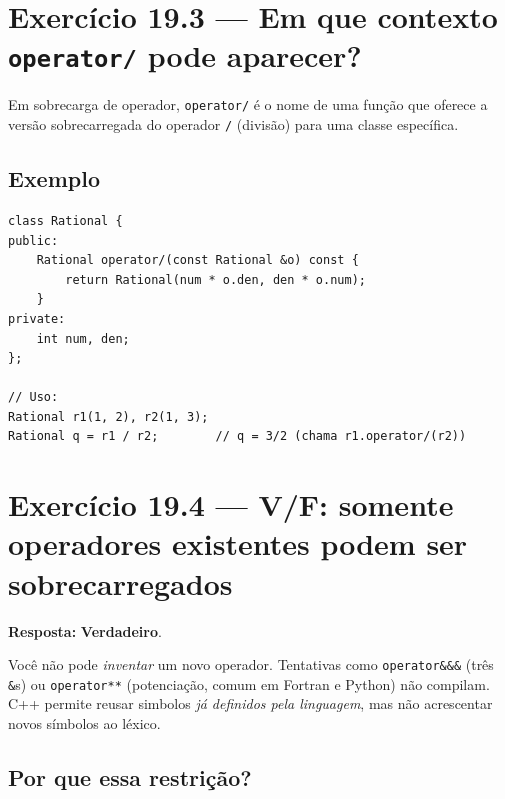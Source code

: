 \documentclass[11pt,a4paper]{article}
\begin{document}
\section{Exerc\'icio 19.3 --- Em que contexto \texttt{operator/} pode aparecer?}

\begin{resposta}
Em sobrecarga de operador, \texttt{operator/} \'e o nome de uma fun\c{c}\~ao que oferece a vers\~ao sobrecarregada do operador \texttt{/} (divis\~ao) para uma classe espec\'ifica.
\end{resposta}

\subsection*{Exemplo}

\begin{lstlisting}[style=cppcode,numbers=none]
class Rational {
public:
    Rational operator/(const Rational &o) const {
        return Rational(num * o.den, den * o.num);
    }
private:
    int num, den;
};

// Uso:
Rational r1(1, 2), r2(1, 3);
Rational q = r1 / r2;        // q = 3/2 (chama r1.operator/(r2))
\end{lstlisting}

\section{Exerc\'icio 19.4 --- V/F: somente operadores existentes podem ser sobrecarregados}

\begin{resposta}\textbf{Resposta:} \textbf{Verdadeiro}.\end{resposta}

Voc\^e n\~ao pode \emph{inventar} um novo operador. Tentativas como \texttt{operator\&\&\&} (tr\^es \texttt{\&}s) ou \texttt{operator**} (potencia\c{c}\~ao, comum em Fortran e Python) n\~ao compilam. C++ permite reusar simbolos \emph{j\'a definidos pela linguagem}, mas n\~ao acrescentar novos s\'imbolos ao l\'exico.

\subsection*{Por que essa restri\c{c}\~ao?}
\end{document}
